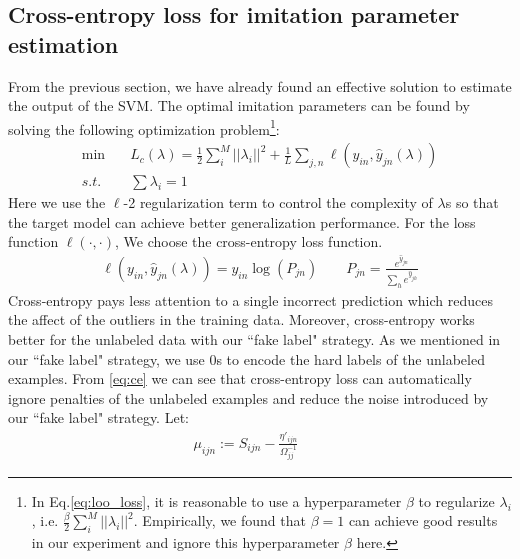 \subsection{Cross-entropy loss for imitation parameter estimation}
From the previous section, we have already found an effective solution to estimate the output of the SVM. The optimal imitation parameters can be found by solving the following optimization problem\footnote{In Eq.\eqref{eq:loo_loss}, it is reasonable to use a hyperparameter $\beta$ to regularize $\lambda_i$, i.e. $\frac{\beta}{2}\sum_i^M||\lambda_i||^2$. Empirically, we found that $\beta=1$ can achieve good results in our experiment and ignore this hyperparameter $\beta$ here.}:
\begin{equation}\label{eq:loo_loss}
\begin{aligned}
\min \quad& L_c\left(\lambda\right)=\frac{1}{2}\sum_i^M||\lambda_i||^2+\frac{1}{L}\sum_{j,n}\ell\left(y_{in},\hat{y}_{jn}\left(\lambda\right)\right)\\
s.t. \quad& \sum\lambda_i=1
\end{aligned}
\end{equation}
Here we use the $\ell$-2 regularization term to control the complexity of $\lambda$s so that the target model can achieve better generalization performance. For the loss function $\ell(\cdot,\cdot)$, We choose the cross-entropy loss function.
\begin{equation}\label{eq:ce}
\begin{aligned}
\ell\left(y_{in},\hat{y}_{jn}\left(\lambda\right)\right)=y_{in}\log(P_{jn}) \qquad
P_{jn} = \frac{e^{\hat{y}_{jn}}}{\sum_{h} e^{\hat{y}_{jh}}}
\end{aligned}
\end{equation}
Cross-entropy pays less attention to a single incorrect prediction which reduces the affect of the outliers in the training data. Moreover, cross-entropy works better for the unlabeled data with our ``fake label" strategy. As we mentioned in our ``fake label" strategy, we use 0s to encode the hard labels of the unlabeled examples. From \eqref{eq:ce} we can see that cross-entropy loss can automatically ignore penalties of the unlabeled examples and reduce the noise introduced by our ``fake label" strategy. 
Let:
\begin{equation}\label{eq:mu}
\begin{aligned}
\mu_{ijn}:=S_{ijn}-\frac{{\eta}'_{ijn}}{\Omega_{jj}^{-1}} \qquad
\end{aligned}
\end{equation}
